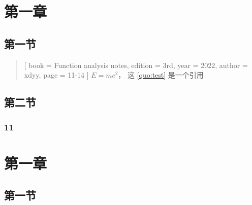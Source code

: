 \documentclass{xdyy-notes}
\begin{document}
\maketitle

\frontmatter

\begin{preface}
  \zhlipsum[1-3]
\end{preface}

\tableofcontents

\mainmatter

\chapter{第一章}

\section{第一节}

\begin{quotation}[
  book = {Function analysis notes},
  edition = {3rd},
  year = {2022},
  author = {xdyy},
  page = {11-14}
]\label{quo:test}
  $E = m c^2$， 这 \ref{quo:test} 是一个引用
\end{quotation}

\zhlipsum[1-6]



\section{第二节}


\subsection{11}


\zhlipsum[1-2]



\chapter{第一章}

\section{第一节}
\cite{DiophantineQueffelec}


\backmatter
\printbibliography
\end{document}
